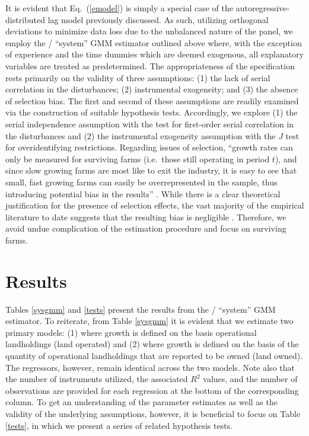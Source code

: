 \documentclass[english]{article}
\begin{document}
It is evident that Eq.\ (\ref{emodel}) is simply a special case of the 
autoregressive-distributed lag model previously discussed. 
As such, utilizing orthogonal deviations to minimize data loss due to the 
unbalanced nature of the panel, we employ the 
\citet{arellano1995}/\citet{blundell1998} ``system'' GMM estimator outlined 
above where, with the exception of experience and the time dummies 
which are deemed exogenous, all explanatory variables are treated as 
predetermined. 
The appropriateness of the specification rests primarily on the validity of 
three assumptions: (1) the lack of serial correlation in the disturbances; 
(2) instrumental exogeneity; and (3) the absence of selection bias. 
The first and second of these assumptions are readily examined via the 
construction of suitable hypothesis tests. 
Accordingly, we explore (1) the serial independence assumption with the 
\citet{arellano1991} test for first-order serial correlation in the disturbances 
and (2) the instrumental exogeneity assumption with the \citet{hansen1982} 
$J$ test for overidentifying restrictions. 
Regarding issues of selection, ``growth rates can only be measured for 
surviving farms (i.e.\ those still operating in period $t$), and since slow 
growing farms are most like to exit the industry, it is easy to see that small, 
fast growing farms can easily be overrepresented in the sample, thus 
introducing potential bias in the results'' \citep[pg.\ 790]{bakucs2009}. 
While there is a clear theoretical justification for the presence of selection 
effects, the vast majority of the empirical literature to date suggests that the 
resulting bias is negligible \citep{evans1987, hall1987, weiss1999, dries2004}. 
Therefore, we avoid undue complication of the estimation procedure and 
focus on surviving farms.


\section{Results}
\label{sec: results}

Tables \ref{sysgmm} and \ref{tests} present the results from the \citet{arellano1995}/\citet{blundell1998} ``system'' GMM estimator. To reiterate, from Table \ref{sysgmm} it is evident that we estimate two primary models: (1) where growth is defined on the basis operational landholdings (land operated) and (2) where growth is defined on the basis of the quantity of operational landholdings that are reported to be owned (land owned). The regressors, however, remain identical across the two models. Note also that the number of instruments utilized, the associated $R^2$ values, and the number of observations are provided for each regression at the bottom of the corresponding column. To get an understanding of the parameter estimates as well as the validity of the underlying assumptions, however, it is beneficial to focus on Table \ref{tests}, in which we present a series of related hypothesis tests.
\end{document}
